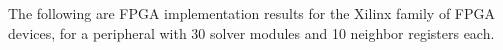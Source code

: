 \label{sec:ir}
The following are FPGA implementation results for the Xilinx family of FPGA devices, for a peripheral with 30 solver
modules and 10 neighbor registers each.

